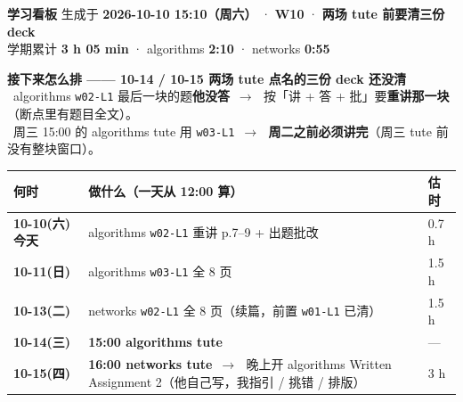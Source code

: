 \documentclass[10pt,a4paper]{article}
\newcommand{\bang}{\leavevmode{\color{hot}\ding{115}}}
\newcommand{\arr}{\,$\rightarrow$\,}
\begin{document}
\begin{tcolorbox}[colback=cool!8,colframe=cool,boxrule=1pt,arc=2pt,left=8pt,right=8pt,top=5pt,bottom=5pt]
{\sffamily\bfseries\LARGE\color{cool} 学习看板}\hfill
{\sffamily\small 生成于 \textbf{2026-10-10 15:10（周六）} · \textbf{W10} · \textcolor{hot}{\textbf{两场 tute 前要清三份 deck}}}\\[3pt]
{\sffamily\small 学期累计 \textbf{3 h 05 min} · algorithms \textbf{2:10} · networks \textbf{0:55}}
\end{tcolorbox}

\begin{tcolorbox}[breakable,colback=hotbg,colframe=hot,boxrule=1.2pt,arc=2pt,left=8pt,right=8pt,top=6pt,bottom=6pt]
{\sffamily\bfseries\color{hot}  接下来怎么排 —— 10-14 / 10-15 两场 tute 点名的三份 deck 还没清}\\[5pt]
\bang\ algorithms \texttt{w02-L1} 最后一块的题\textbf{他没答} \arr\ 按「讲 + 答 + 批」要\textbf{重讲那一块}（断点里有题目全文）。\\[4pt]
\bang\ 周三 15:00 的 algorithms tute 用 \texttt{w03-L1} \arr\ \textbf{周二之前必须讲完}（周三 tute 前没有整块窗口）。
\end{tcolorbox}

\vspace{4pt}
\begin{longtable}{@{}L{2.9cm}L{10.7cm}L{2.5cm}@{}}
\textbf{何时} & \textbf{做什么（一天从 12:00 算）} & \textbf{估时} \\
\endhead
{}
\textbf{10-10(六) 今天} & algorithms \texttt{w02-L1} 重讲 p.7--9 + 出题批改 & 0.7 h \\
\textbf{10-11(日)} & algorithms \texttt{w03-L1} 全 8 页 & 1.5 h \\
\textbf{10-13(二)} & networks \texttt{w02-L1} 全 8 页（续篇，前置 \texttt{w01-L1} 已清）& 1.5 h \\
\textbf{10-14(三)} & \textbf{15:00 algorithms tute} & --- \\
\textbf{10-15(四)} & \textbf{16:00 networks tute} \arr\ 晚上开 algorithms Written Assignment 2（他自己写，我指引 / 挑错 / 排版）& 3 h \\
\end{longtable}
\end{document}

